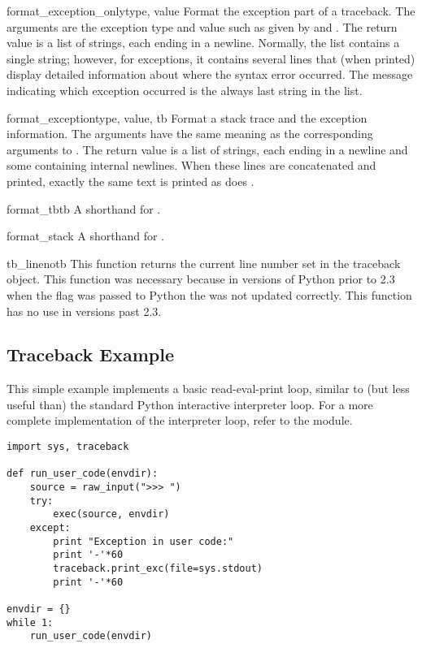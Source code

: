 \begin{funcdesc}{format_exception_only}{type, value}
Format the exception part of a traceback.  The arguments are the
exception type and value such as given by  and
.  The return value is a list of strings, each
ending in a newline.  Normally, the list contains a single string;
however, for  exceptions, it contains several
lines that (when printed) display detailed information about where the
syntax error occurred.  The message indicating which exception
occurred is the always last string in the list.
\end{funcdesc}

\begin{funcdesc}{format_exception}{type, value, tb}
Format a stack trace and the exception information.  The arguments 
have the same meaning as the corresponding arguments to
.  The return value is a list of strings,
each ending in a newline and some containing internal newlines.  When
these lines are concatenated and printed, exactly the same text is
printed as does .
\end{funcdesc}

\begin{funcdesc}{format_tb}{tb}
A shorthand for .
\end{funcdesc}

\begin{funcdesc}{format_stack}{}
A shorthand for .
\end{funcdesc}

\begin{funcdesc}{tb_lineno}{tb}
This function returns the current line number set in the traceback
object.  This function was necessary because in versions of Python
prior to 2.3 when the  flag was passed to Python the
 was not updated correctly.  This function
has no use in versions past 2.3.
\end{funcdesc}


\subsection{Traceback Example \label{traceback-example}}

This simple example implements a basic read-eval-print loop, similar
to (but less useful than) the standard Python interactive interpreter
loop.  For a more complete implementation of the interpreter loop,
refer to the  module.

\begin{verbatim}
import sys, traceback

def run_user_code(envdir):
    source = raw_input(">>> ")
    try:
        exec(source, envdir)
    except:
        print "Exception in user code:"
        print '-'*60
        traceback.print_exc(file=sys.stdout)
        print '-'*60

envdir = {}
while 1:
    run_user_code(envdir)
\end{verbatim}
